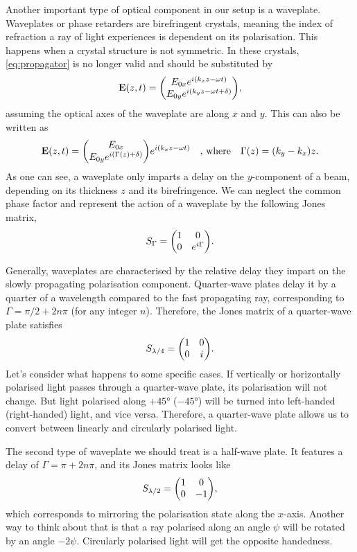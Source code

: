 Another important type of optical component in our setup is a waveplate. Waveplates or phase retarders are birefringent crystals, meaning the index of refraction a ray of light experiences is dependent on its polarisation. This happens when a crystal structure is not symmetric.  In these crystals, \autoref{eq:propagator} is no longer valid and should be substituted by
\begin{equation}
	\vb{E}(z, t) = \mqty(\Eox e^{i(k_x z-\omega t)} \\ \Eoy e^{i(k_y z-\omega t + \delta)} ),
\end{equation}
assuming the optical axes of the waveplate are along $ x $ and $ y $. This can also be written as
\begin{equation}
	\vb{E}(z, t) = \mqty(\Eox  \\ \Eoy e^{i(\Gamma(z) + \delta)} ) e^{i(k_x z-\omega t)}
	\qq{, where}
	\Gamma(z) = (k_y-k_x) z.
\end{equation}
As one can see, a waveplate only imparts a delay on the $ y $-component of a beam, depending on its thickness $ z $ and its birefringence. We can neglect the common phase factor and represent the action of a waveplate by the following Jones matrix, 
\begin{equation}
	S_\Gamma = \mqty(1 & 0 \\ 0 & e^{i\Gamma}).
\end{equation}

Generally, waveplates are characterised by the relative delay they impart on the slowly propagating polarisation component. Quarter-wave plates delay it by a quarter of a wavelength compared to the fast propagating ray, corresponding to $ \Gamma = \pi/2 + 2n\pi $ (for any integer $ n $). Therefore, the Jones matrix of a quarter-wave plate satisfies 
\begin{equation}
	S_\qwp = \mqty(1 & 0 \\ 0 & i).
\end{equation}
Let's consider what happens to some specific cases. If vertically or horizontally polarised light passes through a quarter-wave plate, its polarisation will not change. But light polarised along $ +\ang{45} $ ($ -\ang{45} $) will be turned into left-handed (right-handed) light, and vice versa. Therefore, a quarter-wave plate allows us to convert between linearly and circularly polarised light. 

The second type of waveplate we should treat is a half-wave plate. It features a delay of $ \Gamma = \pi + 2n\pi $, and its Jones matrix looks like
\begin{equation}
	S_\hwp = \mqty(1 & 0 \\ 0 & -1),
\end{equation}
which corresponds to mirroring the polarisation state along the $ x $-axis. Another way to think about that is that a ray polarised along an angle $ \psi $ will be rotated by an angle $ -2\psi $. Circularly polarised light will get the opposite handedness.

